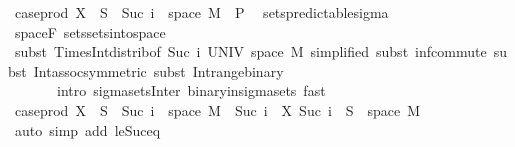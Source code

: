 \begin{isabellebody}
\ {\isachardoublequoteopen}case{\isacharunderscore}{\kern0pt}prod\ X\ {\isacharminus}{\kern0pt}{\isacharbackquote}{\kern0pt}\ S\ {\isasyminter}\ {\isacharparenleft}{\kern0pt}{\isacharbraceleft}{\kern0pt}Suc\ i{\isacharbraceright}{\kern0pt}\ {\isasymtimes}\ space\ M{\isacharparenright}{\kern0pt}\ {\isasymin}\ {\isasymSigma}\isactrlsub P{\isachardoublequoteclose}\ \isamarkupfalse%
\ sets{\isacharunderscore}{\kern0pt}predictable{\isacharunderscore}{\kern0pt}sigma\ \isamarkupfalse%
\ space{\isacharunderscore}{\kern0pt}F\ sets{\isachardot}{\kern0pt}sets{\isacharunderscore}{\kern0pt}into{\isacharunderscore}{\kern0pt}space\isanewline
\ \ \ \ \isamarkupfalse%
\ {\isacharparenleft}{\kern0pt}subst\ Times{\isacharunderscore}{\kern0pt}Int{\isacharunderscore}{\kern0pt}distrib{}{\isacharbrackleft}{\kern0pt}of\ {\isachardoublequoteopen}{\isacharbraceleft}{\kern0pt}Suc\ i{\isacharbraceright}{\kern0pt}{\isachardoublequoteclose}\ UNIV\ {\isachardoublequoteopen}space\ M{\isachardoublequoteclose}{\isacharcomma}{\kern0pt}\ simplified{\isacharbrackright}{\kern0pt}{\isacharcomma}{\kern0pt}\ subst\ inf{\isachardot}{\kern0pt}commute{\isacharcomma}{\kern0pt}\ subst\ Int{\isacharunderscore}{\kern0pt}assoc{\isacharbrackleft}{\kern0pt}symmetric{\isacharbrackright}{\kern0pt}{\isacharcomma}{\kern0pt}\ subst\ Int{\isacharunderscore}{\kern0pt}range{\isacharunderscore}{\kern0pt}binary{\isacharparenright}{\kern0pt}\ \isanewline
\ \ \ \ \ \ \ {\isacharparenleft}{\kern0pt}intro\ sigma{\isacharunderscore}{\kern0pt}sets{\isacharunderscore}{\kern0pt}Inter\ binary{\isacharunderscore}{\kern0pt}in{\isacharunderscore}{\kern0pt}sigma{\isacharunderscore}{\kern0pt}sets{\isacharcomma}{\kern0pt}\ fast{\isacharparenright}{\kern0pt}{\isacharplus}{\kern0pt}\isanewline
\ \ \isamarkupfalse%
\ \isamarkupfalse%
\ {\isachardoublequoteopen}case{\isacharunderscore}{\kern0pt}prod\ X\ {\isacharminus}{\kern0pt}{\isacharbackquote}{\kern0pt}\ S\ {\isasyminter}\ {\isacharparenleft}{\kern0pt}{\isacharbraceleft}{\kern0pt}Suc\ i{\isacharbraceright}{\kern0pt}\ {\isasymtimes}\ space\ M{\isacharparenright}{\kern0pt}\ {\isacharequal}{\kern0pt}\ {\isacharbraceleft}{\kern0pt}Suc\ i{\isacharbraceright}{\kern0pt}\ {\isasymtimes}\ {\isacharparenleft}{\kern0pt}X\ {\isacharparenleft}{\kern0pt}Suc\ i{\isacharparenright}{\kern0pt}\ {\isacharminus}{\kern0pt}{\isacharbackquote}{\kern0pt}\ S\ {\isasyminter}\ space\ M{\isacharparenright}{\kern0pt}{\isachardoublequoteclose}\ \isamarkupfalse%
\ {\isacharparenleft}{\kern0pt}auto\ simp\ add{\isacharcolon}{\kern0pt}\ le{\isacharunderscore}{\kern0pt}Suc{\isacharunderscore}{\kern0pt}eq{\isacharparenright}{\kern0pt}\isanewline

\end{isabellebody}

